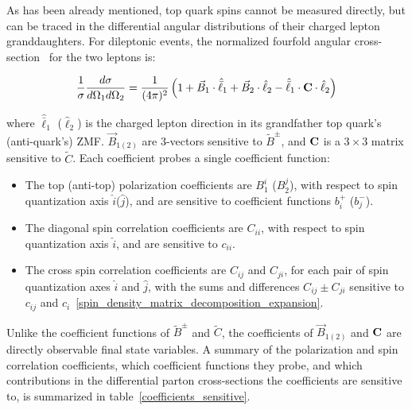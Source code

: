 As has been already mentioned, top quark spins cannot be measured directly, but can be traced in the differential angular distributions of their charged lepton granddaughters.
For \ttbar dileptonic events, the normalized fourfold angular cross-section~\cite{Bernreuther} for the two leptons is:
\begin{linenomath*}
\begin{align}
\frac{1}{\sigma} \frac{d \sigma}{d \Omega_1 d \Omega_2}=\frac{1}{(4 \pi)^2}\left(1+\vec{B}_1 \cdot \hat{\bar{\ell}}_1+\vec{B}_2 \cdot \hat{\ell}_2-\hat{\bar{\ell}}_1 \cdot \mathbf{C} \cdot \hat{\ell}_2\right)
\label{fourfold_angular_distribution}
\end{align}
\end{linenomath*}
where $\hat{\bar{\ell}}_1$ ($\hat{\ell}_2$) is the charged lepton direction in its grandfather top quark's (anti-quark's) ZMF.
$\vec{B}_{1(2)}$ are 3-vectors sensitive to $\tilde{B}^\pm$, and $\mathbf{C}$ is a $3\times3$ matrix sensitive to $\tilde{C}$.
Each coefficient probes a single coefficient function:
\begin{itemize}
\item The top (anti-top) polarization coefficients are $B_1^{i}$ ($B_2^{j}$), with respect to spin quantization axis $\hat{i}$($\hat{j}$), and are sensitive to coefficient functions $b^+_i$ ($b^-_j$).
\item The diagonal spin correlation coefficients are $C_{ii}$, with respect to spin quantization axis $\hat{i}$, and are sensitive to $c_{ii}$.
\item The cross spin correlation coefficients are $C_{ij}$ and $C_{ji}$,  for each pair of spin quantization axes $\hat{i}$ and $\hat{j}$, with the sums and differences $C_{ij} \pm C_{ji}$ sensitive to $c_{ij}$ and $c_{i}$~\ref{spin_density_matrix_decomposition_expansion}.
\end{itemize}
Unlike the coefficient functions of $\tilde{B}^\pm$ and $\tilde{C}$, the coefficients of $\vec{B}_{1(2)}$ and $\mathbf{C}$ are directly observable final state variables.
A summary of the polarization and spin correlation coefficients, which coefficient functions they probe, and which contributions in the differential parton cross-sections the coefficients are sensitive to, is summarized in table~\ref{coefficients_sensitive}.
